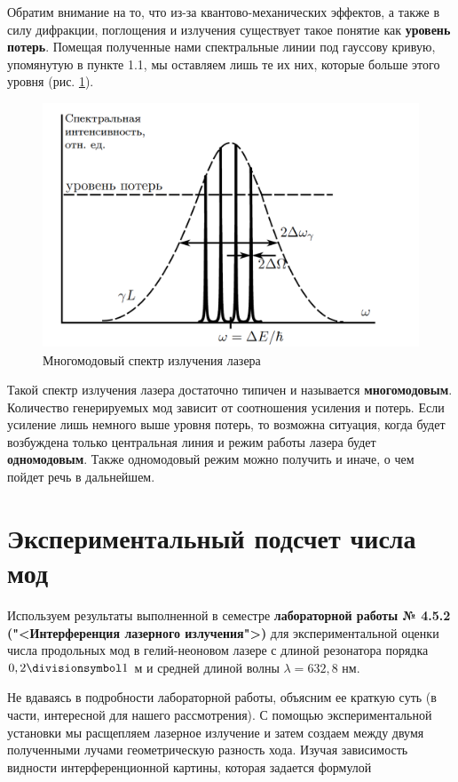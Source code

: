\documentclass[12pt]{kiarticle}
\begin{document}
Обратим внимание на то, что из-за квантово-механических эффектов, а также в силу дифракции, поглощения и излучения существует такое понятие как \textbf{уровень потерь}. Помещая полученные нами спектральные линии под гауссову кривую, упомянутую в пункте 1.1, мы оставляем лишь те их них, которые больше этого уровня (рис. \ref{mods}).

\begin{figure}[h!]
	\centering
	\includegraphics[width=0.7\linewidth]{mods.png}
	\caption{Многомодовый спектр излучения лазера}
	\label{mods}
\end{figure}

Такой спектр излучения лазера достаточно типичен и называется \textbf{многомодовым}. Количество генерируемых мод
зависит от соотношения усиления и потерь. Если усиление лишь немного выше уровня потерь, то возможна ситуация, когда будет возбуждена
только центральная линия и режим работы лазера будет \textbf{одномодовым}. Также одномодовый режим можно получить и иначе, о чем пойдет речь в дальнейшем.

\section{Экспериментальный подсчет числа мод}

Используем результаты выполненной в семестре \textbf{лабораторной работы № 4.5.2 ("<Интерференция лазерного излучения">)} для экспериментальной оценки числа продольных мод в гелий-неоновом лазере с длиной резонатора порядка $ 0,2 \divisionsymbol 1 $ м и средней длиной волны $ \lambda = 632,8 $ нм. 

Не вдаваясь в подробности лабораторной работы, объясним ее краткую суть (в части, интересной для нашего рассмотрения). С помощью экспериментальной установки мы расщепляем лазерное излучение и затем создаем между двумя полученными лучами геометрическую разность хода. Изучая зависимость видности интерференционной картины, которая задается формулой
\end{document}
